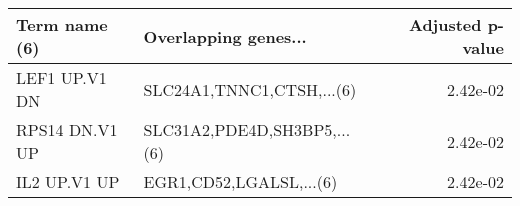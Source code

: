 \begin{tabular}{llr}
\toprule
 Term name (6) &        Overlapping genes... &  Adjusted p-value \\
\midrule
 LEF1 UP.V1 DN &   SLC24A1,TNNC1,CTSH,...(6) &          2.42e-02 \\
RPS14 DN.V1 UP & SLC31A2,PDE4D,SH3BP5,...(6) &          2.42e-02 \\
  IL2 UP.V1 UP &     EGR1,CD52,LGALSL,...(6) &          2.42e-02 \\
\bottomrule
\end{tabular}
